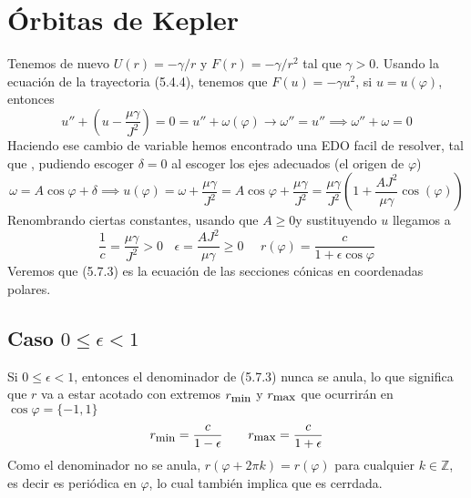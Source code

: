\section{Órbitas de Kepler} 
Tenemos de nuevo $U(r)=-\gamma/r$ y $F(r)=-\gamma/r^2$ tal que $\gamma > 0$. Usando la ecuación de la trayectoria (5.4.4), tenemos que $F(u)=-\gamma u^2$, si $u=u(\varphi)$, entonces
\begin{equation} \label{5.7.1}
    u'' + \left(u -\frac{\mu \gamma}{J^2}\right) = 0 = u'' + \omega(\varphi) \rightarrow \omega'' = u'' \implies \omega'' + \omega = 0 
\end{equation} 
Haciendo ese cambio de variable hemos encontrado una EDO facil de resolver, tal que , pudiendo escoger $\delta =0$ al escoger los ejes adecuados (el origen de $\varphi$)
\begin{equation} \label{5.7.2}
    \omega = A \cos{\varphi +\delta} \implies u(\varphi) = \omega + \frac{\mu \gamma}{J^2} = A \cos{\varphi} +\frac{\mu \gamma}{J^2} = \frac{\mu \gamma}{J^2}\left(1+ \frac{A J^2}{\mu \gamma} \cos(\varphi)\right)
\end{equation} 
Renombrando ciertas constantes, usando que $A\geq0$y sustituyendo $u$ llegamos a 
\begin{equation} \label{5.7.3}
    \frac{1}{c} = \frac{\mu \gamma}{J^2}>0 \ \ \ \ \epsilon=\frac{A J^2}{\mu \gamma}\geq 0 \ \ \ \ \ \ r(\varphi) = \frac{c}{1+\epsilon \cos\varphi}
\end{equation} 
Veremos que (5.7.3) es la ecuación de las secciones cónicas en coordenadas polares.
\subsection{Caso $0 \leq \epsilon < 1 $}
Si $0 \leq \epsilon < 1 $, entonces el denominador de (5.7.3) nunca se anula, lo que significa que $r$ va a estar acotado con extremos $r_{\mbox{\small min}}$ y $r_{\mbox{\small max}}$ que ocurrirán en $\cos \varphi = \{-1,1\}$
\begin{equation} \label{5.7.4}
    r_{\mbox{\small min}}= \frac{c}{1-\epsilon} \ \ \ \ \ \ r_{\mbox{\small max}} = \frac{c}{1+\epsilon}
\end{equation} 
Como el denominador no se anula, $r(\varphi+2\pi k)=r(\varphi)$ para cualquier $k\in \mathbb{Z}$, es decir es periódica en $\varphi$, lo cual también implica que es cerrdada.


